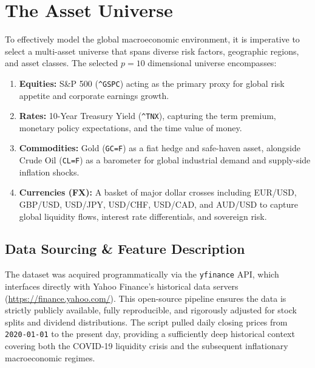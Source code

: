 \documentclass[12pt,twoside]{report}
\begin{document}
\section{The Asset Universe}
To effectively model the global macroeconomic environment, it is imperative to select a multi-asset universe that spans diverse risk factors, geographic regions, and asset classes. The selected $p=10$ dimensional universe encompasses:
\begin{enumerate}
    \item \textbf{Equities:} S\&P 500 (\texttt{\^{}GSPC}) acting as the primary proxy for global risk appetite and corporate earnings growth.
    \item \textbf{Rates:} 10-Year Treasury Yield (\texttt{\^{}TNX}), capturing the term premium, monetary policy expectations, and the time value of money.
    \item \textbf{Commodities:} Gold (\texttt{GC=F}) as a fiat hedge and safe-haven asset, alongside Crude Oil (\texttt{CL=F}) as a barometer for global industrial demand and supply-side inflation shocks.
    \item \textbf{Currencies (FX):} A basket of major dollar crosses including EUR/USD, GBP/USD, USD/JPY, USD/CHF, USD/CAD, and AUD/USD to capture global liquidity flows, interest rate differentials, and sovereign risk.
\end{enumerate}

\subsection{Data Sourcing \& Feature Description}
The dataset was acquired programmatically via the \texttt{yfinance} API, which interfaces directly with Yahoo Finance's historical data servers (\url{https://finance.yahoo.com/}). This open-source pipeline ensures the data is strictly publicly available, fully reproducible, and rigorously adjusted for stock splits and dividend distributions. The script pulled daily closing prices from \texttt{2020-01-01} to the present day, providing a sufficiently deep historical context covering both the COVID-19 liquidity crisis and the subsequent inflationary macroeconomic regimes.
\end{document}
